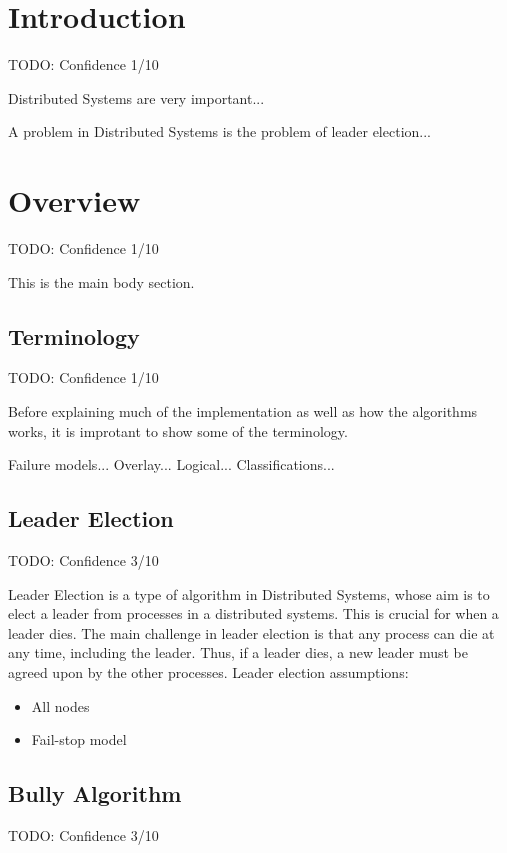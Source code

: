 \documentclass{report}
\begin{document}

\chapter{Introduction}
TODO: Confidence 1/10

Distributed Systems are very important...

A problem in Distributed Systems is the problem of leader election...

\chapter{Overview}
TODO: Confidence 1/10

This is the main body section.

\section{Terminology}
TODO: Confidence 1/10

Before explaining much of the implementation as well as how the algorithms works, it is improtant to show some of the terminology.

Failure models...
Overlay...
Logical...
Classifications...

\section{Leader Election}
TODO: Confidence 3/10

Leader Election is a type of algorithm in Distributed Systems, whose aim is to elect a leader from processes in a distributed systems. This is crucial for when a leader dies. The main challenge in leader election is that any process can die at any time, including the leader. Thus, if a leader dies, a new leader must be agreed upon by the other processes.
Leader election assumptions:
\begin{itemize}
        \item All nodes
        \item Fail-stop model
\end{itemize}





\section{Bully Algorithm}
TODO: Confidence 3/10
\end{document}
